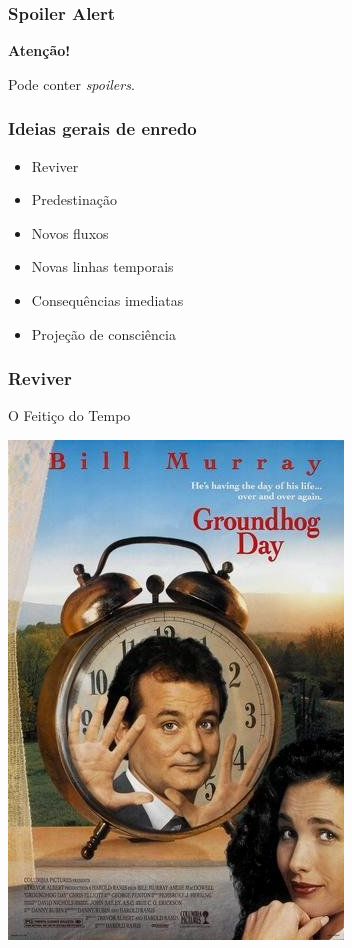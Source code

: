 \begin{frame}
    \frametitle{Spoiler Alert}

    \centering
    
    \alert{\Huge \bfseries Atenção!}
    
    {Pode conter {\em spoilers}.}
\end{frame}

\begin{frame}
    \frametitle{Ideias gerais de enredo}

    \begin{itemize}
        \item Reviver
        \item Predestinação
        \item Novos fluxos
        \item Novas linhas temporais
        \item Consequências imediatas
        \item Projeção de consciência
    \end{itemize}
\end{frame}

\begin{frame}
    \frametitle{Reviver}
    
    \alert{O Feitiço do Tempo}

    \includegraphics[height=0.8\textheight]{img/posters/groundhog_day.jpg}
\end{frame}

